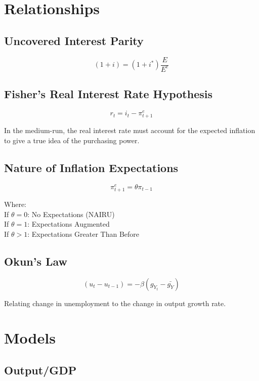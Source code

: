 \documentclass[11pt, english]{article}
\begin{document}
\newpage

\section{Relationships}

	\subsection{Uncovered Interest Parity}

	$$(1+i)=(1+i^*)\frac{E}{E^e}$$

	\subsection{Fisher's Real Interest Rate Hypothesis}

	$$r_t=i_t-\pi_{t+1}^e$$

	In the medium-run, the real interest rate must account for the expected inflation to give a true idea of the purchasing power.

	\subsection{Nature of Inflation Expectations}

	$$\pi_{t+1}^e=\theta\pi_{t-1}$$

	Where:\\
	If $\theta=0$: No Expectations (NAIRU)\\
	If $\theta=1$: Expectations Augmented\\
	If $\theta>1$: Expectations Greater Than Before

	\subsection{Okun's Law}

	$$(u_t-u_{t-1})=-\beta(g_{Y_t}-\bar{g_Y})$$

	Relating change in unemployment to the change in output growth rate.

\newpage

\section{Models}

	\subsection{Output/GDP}
\end{document}
